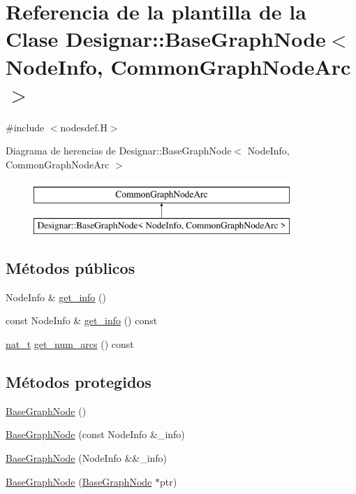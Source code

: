 \hypertarget{class_designar_1_1_base_graph_node}{}\section{Referencia de la plantilla de la Clase Designar\+:\+:Base\+Graph\+Node$<$ Node\+Info, Common\+Graph\+Node\+Arc $>$}
\label{class_designar_1_1_base_graph_node}


{\ttfamily \#include $<$nodesdef.\+H$>$}

Diagrama de herencias de Designar\+:\+:Base\+Graph\+Node$<$ Node\+Info, Common\+Graph\+Node\+Arc $>$\begin{figure}[H]
\begin{center}
\leavevmode
\includegraphics[height=2.000000cm]{class_designar_1_1_base_graph_node}
\end{center}
\end{figure}
\subsection*{Métodos públicos}
\begin{DoxyCompactItemize}
\item 
Node\+Info \& \hyperlink{class_designar_1_1_base_graph_node_a5626bf91fcef0dd6f29dc503c33ecfc9}{get\+\_\+info} ()
\item 
const Node\+Info \& \hyperlink{class_designar_1_1_base_graph_node_a2f9f7069df485bc555066eb57d05e7a8}{get\+\_\+info} () const
\item 
\hyperlink{namespace_designar_aa72662848b9f4815e7bf31a7cf3e33d1}{nat\+\_\+t} \hyperlink{class_designar_1_1_base_graph_node_a3dbfd6cc251093522f54d51956968c54}{get\+\_\+num\+\_\+arcs} () const
\end{DoxyCompactItemize}
\subsection*{Métodos protegidos}
\begin{DoxyCompactItemize}
\item 
\hyperlink{class_designar_1_1_base_graph_node_a6eb12fac0ce731cb881c31b095493ef5}{Base\+Graph\+Node} ()
\item 
\hyperlink{class_designar_1_1_base_graph_node_ada20ee8b29e8372f93b7deb6a93c2be1}{Base\+Graph\+Node} (const Node\+Info \&\+\_\+info)
\item 
\hyperlink{class_designar_1_1_base_graph_node_a3e36c23ee7f22345b2ebbad09304dca0}{Base\+Graph\+Node} (Node\+Info \&\&\+\_\+info)
\item 
\hyperlink{class_designar_1_1_base_graph_node_aa64ba400e5d1fff18b7fb10071e7b97c}{Base\+Graph\+Node} (\hyperlink{class_designar_1_1_base_graph_node}{Base\+Graph\+Node} $\ast$ptr)
\end{DoxyCompactItemize}
